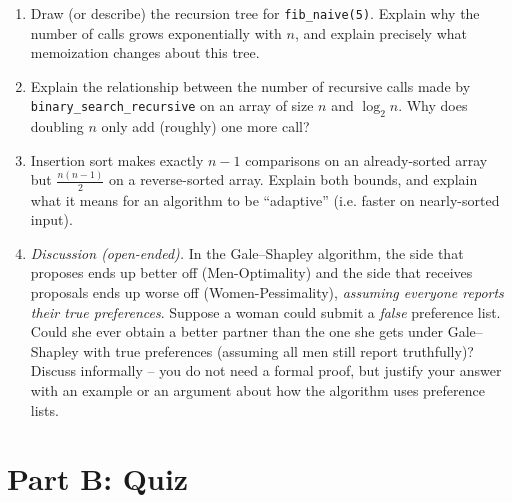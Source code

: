 \documentclass[11pt]{article}
\begin{document}
\begin{enumerate}[label=\textbf{A\arabic*.}, leftmargin=2.2em]
\item Draw (or describe) the recursion tree for \texttt{fib\_naive(5)}. Explain why the
number of calls grows exponentially with $n$, and explain precisely what memoization
changes about this tree.

\item Explain the relationship between the number of recursive calls made by
\texttt{binary\_search\_recursive} on an array of size $n$ and $\log_2 n$. Why does
doubling $n$ only add (roughly) one more call?

\item Insertion sort makes exactly $n-1$ comparisons on an already-sorted array but
$\frac{n(n-1)}{2}$ on a reverse-sorted array. Explain both bounds, and explain what it
means for an algorithm to be ``adaptive'' (i.e. faster on nearly-sorted input).

\item \emph{Discussion (open-ended).} In the Gale--Shapley algorithm, the side that
proposes ends up better off (Men-Optimality) and the side that receives proposals ends up
worse off (Women-Pessimality), \emph{assuming everyone reports their true preferences}.
Suppose a woman could submit a \emph{false} preference list. Could she ever obtain a
better partner than the one she gets under Gale--Shapley with true preferences (assuming
all men still report truthfully)? Discuss informally -- you do not need a formal proof,
but justify your answer with an example or an argument about how the algorithm uses
preference lists.

\end{enumerate}

\newpage
\section*{Part B: Quiz}
\end{document}
